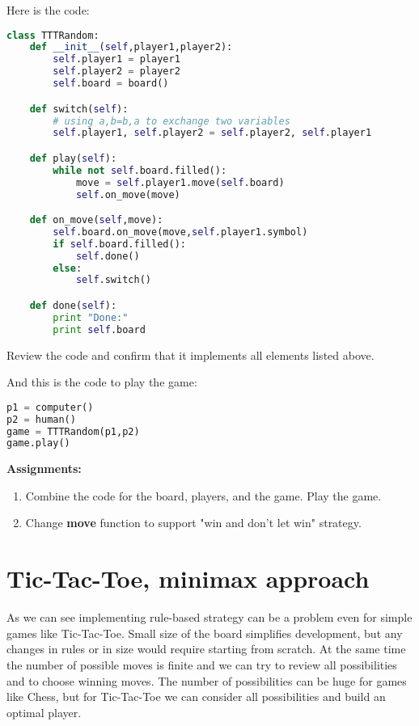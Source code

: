Here is the code:

\begin{lstlisting}[language=Python,style=codelst2,caption={Tic-Tac-Toe: the game}]
class TTTRandom:
    def __init__(self,player1,player2):
        self.player1 = player1
        self.player2 = player2
        self.board = board()

    def switch(self):
        # using a,b=b,a to exchange two variables
        self.player1, self.player2 = self.player2, self.player1

    def play(self):
        while not self.board.filled():
            move = self.player1.move(self.board)
            self.on_move(move)

    def on_move(self,move):
        self.board.on_move(move,self.player1.symbol)
        if self.board.filled():
            self.done()
        else:
            self.switch()

    def done(self):
        print "Done:"
        print self.board
\end{lstlisting}
Review the code and confirm that it implements all elements listed above.

And this is the code to play the game:

\begin{lstlisting}[language=Python,style=codelst2,caption={Tic-Tac-Toe: playing the game}]
p1 = computer()
p2 = human()
game = TTTRandom(p1,p2)
game.play()
\end{lstlisting}

\textbf{Assignments:}
\begin{enumerate}
\item Combine the code for the board, players, and the game. Play the game.
\item Change \textbf{move} function to support "win and don't let win"
strategy.
\end{enumerate}


\section{Tic-Tac-Toe, minimax approach}

As we can see implementing rule-based strategy can be a problem
even for simple games like Tic-Tac-Toe. Small size of the board
simplifies development, but any changes in rules or in size
would require starting from scratch. At the same time the number
of possible moves is finite and we can try to review all possibilities
and to choose winning moves. The number of possibilities can be
huge for games like Chess, but for Tic-Tac-Toe we can consider
all possibilities and build an optimal player.

